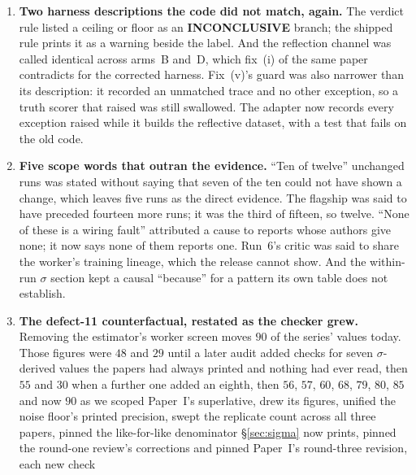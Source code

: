\documentclass[11pt]{article}
\begin{document}
\begin{enumerate}
    shows a second instance it did not comment on: on run~1's first seed arm~B's winning
    \texttt{generate} gene is the empty string, and that seed carries two thirds of the run's
    $\dd$. Both sites now report it. Found by the second review round, from the record's own gene
    hashes; the earlier revision built the record and read only its critique column.
  \item \textbf{Two harness descriptions the code did not match, again.} The verdict rule listed a
    ceiling or floor as an \textbf{INCONCLUSIVE} branch; the shipped rule prints it as a warning
    beside the label. And the
    reflection channel was called identical across arms~B and~D, which fix~(i) of the same paper
    contradicts for the corrected harness. Fix~(v)'s guard was also narrower than its description:
    it recorded an unmatched trace and no other exception, so a truth scorer that raised was still
    swallowed. The adapter now records every exception raised while it builds the reflective
    dataset, with a test that fails on the old code.
  \item \textbf{Five scope words that outran the evidence.} ``Ten of twelve'' unchanged runs was
    stated without saying that seven of the ten could not have shown a change, which leaves five
    runs as the direct evidence. The flagship was said to have preceded fourteen more runs; it was
    the third of fifteen, so twelve. ``None of these is a wiring fault'' attributed a cause to
    reports whose authors give none; it now says none of them reports one. Run~6's critic was said
    to share the worker's training lineage, which the release cannot show. And the within-run $\sigma$ section kept a causal ``because'' for a
    pattern its own table does not establish.
  \item \textbf{The defect-11 counterfactual, restated as the checker grew.} Removing the
    estimator's worker screen moves $90$ of the series' values today. Those figures were $48$ and
    $29$ until a later audit added checks for seven $\sigma$-derived values the papers had always
    printed and nothing had ever read, then $55$ and $30$ when a further one added an eighth, then
    $56$, $57$, $60$, $68$, $79$, $80$, $85$ and now $90$ as we scoped Paper~I's superlative, drew its
    figures, unified the noise floor's printed precision, swept the replicate count across all
    three papers, pinned the like-for-like denominator \S\ref{sec:sigma} now prints, pinned the
    round-one review's corrections and pinned Paper~I's round-three revision, each new check

\end{enumerate}
\end{document}
